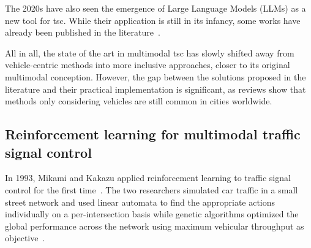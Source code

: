 The 2020s have also seen the emergence of Large Language Models (LLMs) as a new tool for \gls{tsc}. While their application is still in its infancy, some works have already been published in the literature~\cite{Lai2024, Da2024, Yuan2025}.

All in all, the state of the art in multimodal \gls{tsc} has slowly shifted away from vehicle-centric methods into more inclusive approaches, closer to its original multimodal conception. However, the gap between the solutions proposed in the literature and their practical implementation is significant, as reviews show that methods only considering vehicles are still common in cities worldwide.

\subsection{Reinforcement learning for multimodal traffic signal control}\label{subsec:rlformtsc}
















In 1993, Mikami and Kakazu applied reinforcement learning to traffic signal control for the first time~\cite{Mikami1993}. The two researchers simulated car traffic in a small street network and used linear automata to find the appropriate actions individually on a per-intersection basis while genetic algorithms optimized the global performance across the network using maximum vehicular throughput as objective~\cite{Mikami1994}.

